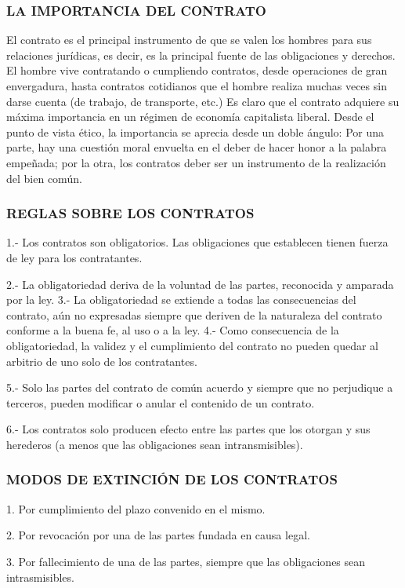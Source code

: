 \subsubsection*{LA IMPORTANCIA DEL CONTRATO}
El contrato es el principal instrumento de que se valen los hombres para sus relaciones jurídicas, es decir, es la principal fuente de las obligaciones y derechos. El hombre vive contratando o cumpliendo contratos, desde operaciones de gran envergadura, hasta contratos cotidianos que el hombre realiza muchas veces sin darse cuenta (de trabajo, de transporte, etc.) Es claro que el contrato adquiere su máxima importancia en un régimen de economía capitalista liberal. Desde el punto de vista ético, la importancia se aprecia desde un doble ángulo: Por una parte, hay una cuestión moral envuelta en el deber de hacer honor a la palabra empeñada; por la otra, los contratos deber ser un instrumento de la realización del bien común.

\subsubsection*{REGLAS SOBRE LOS CONTRATOS}
1.- Los contratos son obligatorios. Las obligaciones que establecen tienen fuerza de ley para los contratantes.

2.- La obligatoriedad deriva de la voluntad de las partes, reconocida y amparada por la ley. 3.- La obligatoriedad se extiende a todas las consecuencias del contrato, aún no expresadas siempre que deriven de la naturaleza del contrato conforme a la buena fe, al uso o a la ley. 4.- Como consecuencia de la obligatoriedad, la validez y el cumplimiento del contrato no pueden quedar al arbitrio de uno solo de los contratantes.

5.- Solo las partes del contrato de común acuerdo y siempre que no perjudique a terceros, pueden modificar o anular el contenido de un contrato.

6.- Los contratos solo producen efecto entre las partes que los otorgan y sus herederos (a menos que las obligaciones sean intransmisibles).

\subsubsection*{MODOS DE EXTINCIÓN DE LOS CONTRATOS}
1. Por cumplimiento del plazo convenido en el mismo.

2. Por revocación por una de las partes fundada en causa legal.

3. Por fallecimiento de una de las partes, siempre que las obligaciones sean intrasmisibles.

